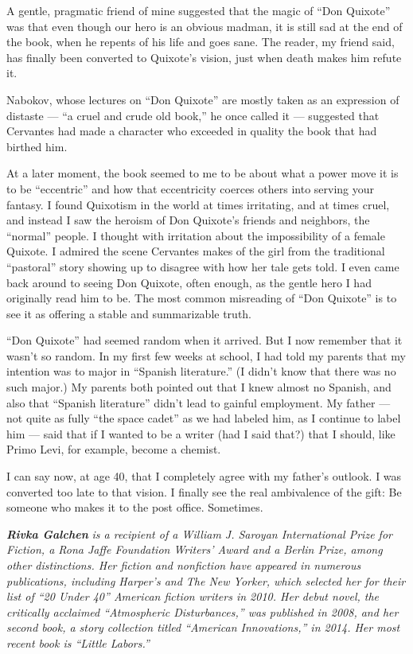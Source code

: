 A gentle, pragmatic friend of mine suggested that the magic of ``Don
Quixote'' was that even though our hero is an obvious madman, it is
still sad at the end of the book, when he repents of his life and goes
sane. The reader, my friend said, has finally been converted to
Quixote's vision, just when death makes him refute it.

Nabokov, whose lectures on ``Don Quixote'' are mostly taken as an
expression of distaste --- ``a cruel and crude old book,'' he once
called it --- suggested that Cervantes had made a character who exceeded
in quality the book that had birthed him.

At a later moment, the book seemed to me to be about what a power move
it is to be ``eccentric'' and how that eccentricity coerces others into
serving your fantasy. I found Quixotism in the world at times
irritating, and at times cruel, and instead I saw the heroism of Don
Quixote's friends and neighbors, the ``normal'' people. I thought with
irritation about the impossibility of a female Quixote. I admired the
scene Cervantes makes of the girl from the traditional ``pastoral''
story showing up to disagree with how her tale gets told. I even came
back around to seeing Don Quixote, often enough, as the gentle hero I
had originally read him to be. The most common misreading of ``Don
Quixote'' is to see it as offering a stable and summarizable truth.

``Don Quixote'' had seemed random when it arrived. But I now remember
that it wasn't so random. In my first few weeks at school, I had told my
parents that my intention was to major in ``Spanish literature.'' (I
didn't know that there was no such major.) My parents both pointed out
that I knew almost no Spanish, and also that ``Spanish literature''
didn't lead to gainful employment. My father --- not quite as fully
``the space cadet'' as we had labeled him, as I continue to label him
--- said that if I wanted to be a writer (had I said that?) that I
should, like Primo Levi, for example, become a chemist.

I can say now, at age 40, that I completely agree with my father's
outlook. I was converted too late to that vision. I finally see the real
ambivalence of the gift: Be someone who makes it to the post office.
Sometimes.

\emph{\textbf{Rivka Galchen}} \emph{is a recipient of a William J.
Saroyan International Prize for Fiction, a Rona Jaffe Foundation
Writers' Award and a Berlin Prize, among other distinctions. Her fiction
and nonfiction have appeared in numerous publications, including
Harper's and The New Yorker, which selected her for their list of ``20
Under 40'' American fiction writers in 2010. Her debut novel, the
critically acclaimed ``Atmospheric Disturbances,'' was published in
2008, and her second book, a story collection titled ``American
Innovations,'' in 2014. Her most recent book is ``Little Labors.''}

